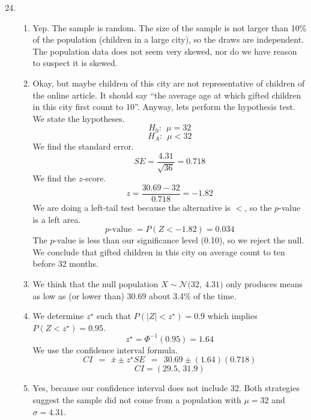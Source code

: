 \documentclass[12pt,letterpaper]{article}
\begin{document}
\newcommand{\N}[2]{\mathcal{N}\big(#1,~#2\big)}
\newcommand{\Geo}[1]{\texttt{Geo}\big(#1\big)}
\newcommand{\B}[2]{\mathcal{B}\big(#1,~#2\big)}
\newcommand{\AND}{\textsc{~and~}}
\newcommand{\OR}{\textsc{~or~}}
\newcommand{\zs}{z^{\star}}

\begin{enumerate}
\setcounter{enumi}{23}

\item \begin{enumerate}
\item Yep. The sample is random. The size of the sample is not larger than 10\% of the population (children in a large city), so the draws are independent. The population data does not seem very skewed, nor do we have reason to suspect it is skewed.
\item Okay, but maybe children of this city are not representative of children of the online article. It should say ``the average age at which gifted children in this city first count to 10''.  Anyway, lets perform the hypothesis test.\\
We state the hypotheses.
$$H_0:~~\mu=32$$
$$H_A:~~\mu<32$$
We find the standard error.
$$SE = \frac{4.31}{\sqrt{36}} = 0.718$$
We find the $z$-score.
$$z = \frac{30.69-32}{0.718} = -1.82 $$
We are doing a left-tail test because the alternative is $<$, so the $p$-value is a left area.
$$p\text{-value } = P(Z<-1.82) = 0.034 $$
The $p$-value is less than our significance level (0.10), so we reject the null. We conclude that gifted children in this city on average count to ten before 32 months.
\item We think that the null population $X\sim \N{32}{4.31}$ only produces means as low as (or lower than) 30.69 about 3.4\% of the time. 
\item We determine $z^\star$ such that $P(|Z|<z^\star) = 0.9$ which implies $P(Z<z^\star) = 0.95$.
$$z^\star = \Phi^{-1}(0.95) = 1.64 $$
We use the confidence interval formula.
$$CI ~~=~~ \bar{x} \pm z^\star SE  ~~=~~ 30.69 \pm (1.64)(0.718)$$
$$CI = (29.5,\,31.9)$$
\item Yes, because our confidence interval does not include 32. Both strategies suggest the sample did not come from a population with $\mu=32$ and $\sigma=4.31$.
\end{enumerate}


\end{enumerate}
\end{document}
